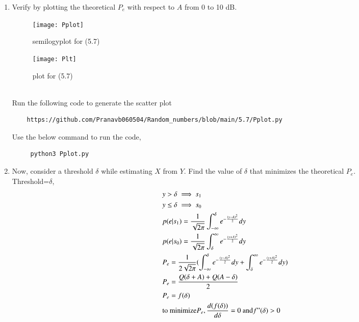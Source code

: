 \documentclass[journal,12pt,twocolumn]{IEEEtran}
\renewcommand\thesection{\arabic{section}}
\begin{document}
\begin{enumerate}[label=\thesection.\arabic*
,ref=\thesection.\theenumi]
\solution
Total probability of bit error:
\begin{align}
&P_{e}=p(s_1)p(e|s_1)+p(s_0)p(e|s_0)\\
&=\frac{1}{2}[Q(A)+Q(A)]\\
&\because p(s_1)=p(s_0)=\frac{1}{2},\text{X has equiprobable symbols}\\
\nonumber
&=Q(A)
&=Q(5) \because A=5
\end{align}
%
\item
Verify by plotting  the theoretical $P_e$ with respect to $A$ from 0 to 10 dB. \\
\solution
\begin{figure}[!ht]
\texttt{[image: Pplot]}
\caption{semilogyplot for (5.7)}
\label{fig:P_Plot}
\end{figure}
\begin{figure}[!ht]
\texttt{[image: Plt]}
\caption{plot for (5.7)}
\label{fig:Plt}
\end{figure}
\\
	Run the following code to generate the scatter plot
	\begin{lstlisting}
	https://github.com/Pranavb060504/Random_numbers/blob/main/5.7/Pplot.py
	\end{lstlisting}
	Use the below command to run the code,
	\begin{lstlisting}
     python3 Pplot.py 
	\end{lstlisting}
\item Now, consider a threshold $\delta$  while estimating $X$ from $Y$. Find the value of $\delta$ that minimizes the theoretical $P_e$.\\
\solution
Threshold=$\delta$, \\
\begin{align}
 &y>\delta \implies s_1\\
 &y \leq \delta \implies s_0\\
 &p(e|s_1)=\frac{1}{\sqrt{2 \pi}} \int_{-\infty}^{\delta} e^{-\frac{(y-A)^{2}}{2}} dy\\
 \nonumber
 &p(e|s_0)=\frac{1}{\sqrt{2 \pi}} \int_{\delta}^{\infty} e^{-\frac{(y+A)^{2}}{2}} dy\\
\nonumber
&P_e=\frac{1}{2\sqrt{2 \pi}}{( \int_{-\infty}^{\delta} e^{-\frac{(y-A)^{2}}{2}}dy+ \int_{\delta}^{\infty} e^{-\frac{(y+A)^{2}}{2}} dy)}\\
&P_e=\frac{Q(\delta+A)+Q(A-\delta)}{2}\\
&P_e=f(\delta)\\
&\text{to minimize} P_e, \frac{d(f(\delta))}{d\delta}=0 ~\text{and} f"(\delta)>0\\

\end{align}
\end{enumerate}
\end{document}

